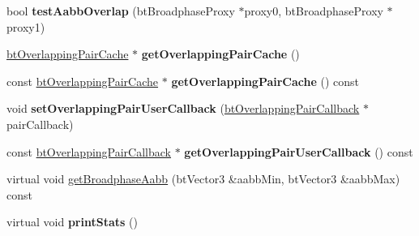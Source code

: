 \begin{DoxyCompactItemize}
\mbox{\label{classbtAxisSweep3Internal_a24ac067f6bebde7e1905620d89c83686}} 
bool {\bfseries test\+Aabb\+Overlap} (bt\+Broadphase\+Proxy $\ast$proxy0, bt\+Broadphase\+Proxy $\ast$proxy1)
\item 
\mbox{\label{classbtAxisSweep3Internal_a501f2bbdc02b65b9ea0a2b42e3237841}} 
\hyperlink{classbtOverlappingPairCache}{bt\+Overlapping\+Pair\+Cache} $\ast$ {\bfseries get\+Overlapping\+Pair\+Cache} ()
\item 
\mbox{\label{classbtAxisSweep3Internal_a5a6c14389040519c9c534908c2eb8498}} 
const \hyperlink{classbtOverlappingPairCache}{bt\+Overlapping\+Pair\+Cache} $\ast$ {\bfseries get\+Overlapping\+Pair\+Cache} () const
\item 
\mbox{\label{classbtAxisSweep3Internal_ae8602eb252ae2085960583bd4f8e7451}} 
void {\bfseries set\+Overlapping\+Pair\+User\+Callback} (\hyperlink{classbtOverlappingPairCallback}{bt\+Overlapping\+Pair\+Callback} $\ast$pair\+Callback)
\item 
\mbox{\label{classbtAxisSweep3Internal_ad76e960a9d725351f5c19aee227db2e8}} 
const \hyperlink{classbtOverlappingPairCallback}{bt\+Overlapping\+Pair\+Callback} $\ast$ {\bfseries get\+Overlapping\+Pair\+User\+Callback} () const
\item 
virtual void \hyperlink{classbtAxisSweep3Internal_ad1e0037e1ed62ef5049389bb4e8fd5b5}{get\+Broadphase\+Aabb} (bt\+Vector3 \&aabb\+Min, bt\+Vector3 \&aabb\+Max) const
\item 
\mbox{\label{classbtAxisSweep3Internal_a5fe22bd436bcafe8f17b939cc6803a2d}} 
virtual void {\bfseries print\+Stats} ()
\end{DoxyCompactItemize}
